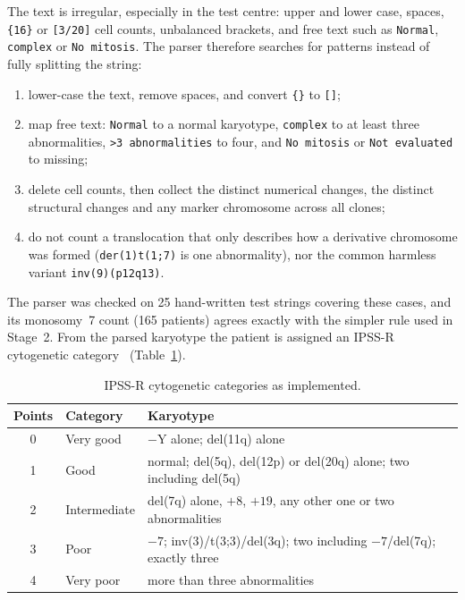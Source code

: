 \documentclass[11pt,a4paper]{article}
\begin{document}
The text is irregular, especially in the test centre: upper and lower case, spaces,
\texttt{\{16\}} or \texttt{[3/20]} cell counts, unbalanced brackets, and free text such as
\texttt{Normal}, \texttt{complex} or \texttt{No mitosis}. The parser therefore searches for
patterns instead of fully splitting the string:
\begin{enumerate}
  \item lower-case the text, remove spaces, and convert \texttt{\{\}} to \texttt{[]};
  \item map free text: \texttt{Normal} to a normal karyotype, \texttt{complex} to at least
        three abnormalities, \texttt{>3 abnormalities} to four, and \texttt{No mitosis} or
        \texttt{Not evaluated} to missing;
  \item delete cell counts, then collect the distinct numerical changes, the distinct
        structural changes and any marker chromosome across all clones;
  \item do not count a translocation that only describes how a derivative chromosome
        was formed (\texttt{der(1)t(1;7)} is one abnormality), nor the common harmless
        variant \texttt{inv(9)(p12q13)}.
\end{enumerate}
The parser was checked on 25 hand-written test strings covering these cases, and its
monosomy~7 count (165 patients) agrees exactly with the simpler rule used in Stage~2.
From the parsed karyotype the patient is assigned an IPSS-R cytogenetic
category~\cite{schanz2012} (Table~\ref{tab:cytocat}).

\begin{table}[H]
\centering
\caption{IPSS-R cytogenetic categories as implemented.}
\label{tab:cytocat}
\begin{tabular}{cll}
\toprule
Points & Category & Karyotype \\
\midrule
0 & Very good    & $-$Y alone; del(11q) alone \\
1 & Good         & normal; del(5q), del(12p) or del(20q) alone; two including del(5q) \\
2 & Intermediate & del(7q) alone, $+8$, $+19$, any other one or two abnormalities \\
3 & Poor         & $-7$; inv(3)/t(3;3)/del(3q); two including $-7$/del(7q); exactly three \\
4 & Very poor    & more than three abnormalities \\
\bottomrule
\end{tabular}
\end{table}
\end{document}
